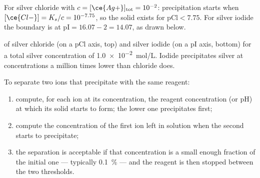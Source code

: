For silver chloride with $c = [\ce{Ag+}]_{\mathrm{tot}} = 10^{-2}$:
precipitation starts when $[\ce{Cl-}] = K_s/c = 10^{-7.75}$, so the solid
exists for $\mathrm{pCl} < 7.75$. For silver iodide the boundary is at
$\mathrm{pI} = 16.07 - 2 = 14.07$, as drawn below.

\begin{omfigure}

{\small {} of silver chloride (on a pCl axis, top) and
silver iodide (on a pI axis, bottom) for a total silver concentration
of \qty{1.0e-2}{mol/L}. Iodide precipitates silver at concentrations a
million times lower than chloride does.}
\end{omfigure}

\begin{method}\label{met:b1:precipitation:selective}
To separate two ions that precipitate with the same reagent:
\begin{enumerate}
  \item compute, for each ion at its concentration, the reagent
        concentration (or pH) at which its solid starts to form; the
        lower one precipitates first;
  \item compute the concentration of the first ion left in solution when
        the second starts to precipitate;
  \item the separation is acceptable if that concentration is a small
        enough fraction of the initial one --- typically \qty{0.1}{\percent}
        --- and the reagent is then stopped between the two thresholds.
\end{enumerate}
\end{method}

